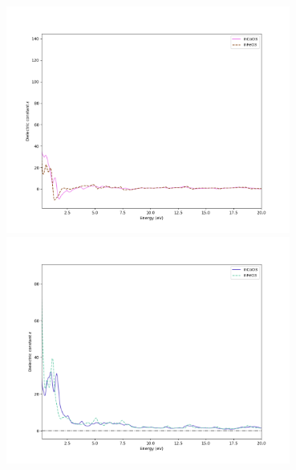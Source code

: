 \documentclass[12pt, letterpaper]{article}
\newcommand*{\1}{\hspace{1pt}}
\begin{document}
    \begin{adjustbox}{center, caption={Dielectric constants of InCoO3 and InFeO3},label={somelabel},nofloat=figure,}
        \includegraphics[width=0.7\textwidth]{dieleceng}
        \includegraphics[width=0.7\textwidth]{dielecimageng}
    \end{adjustbox}
    
\end{document}
